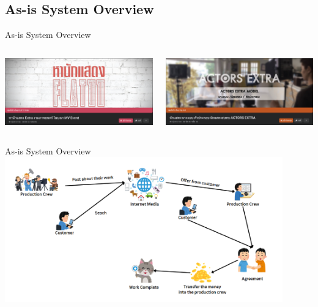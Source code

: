 \documentclass[aspectratio=169]{beamer}
\begin{document}
\subsection{As-is System Overview}
\begin{frame}{As-is System Overview}
    \begin{columns}

        \begin{column}{0.5\textwidth}
            \centering
            \includegraphics[width=\textwidth]{FBGroup1.png}
        \end{column}

        \begin{column}{0.5\textwidth}
            \centering
            \includegraphics[width=\textwidth]{FBGroup2.png}
        \end{column}

    \end{columns}
\end{frame}

\begin{frame}{As-is System Overview}
    \centering
    \includegraphics[width=0.9\textwidth]{asis.png}
\end{frame}
\end{document}
